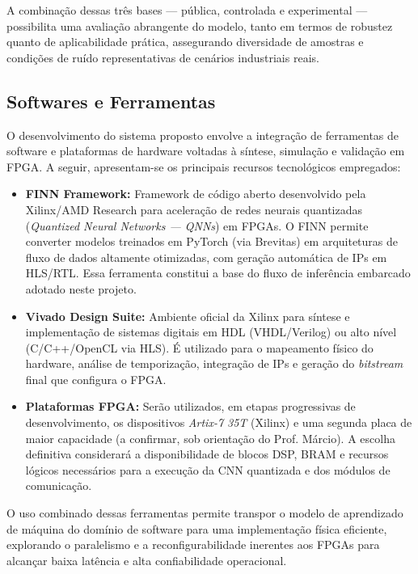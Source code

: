 A combinação dessas três bases — pública, controlada e experimental — possibilita uma avaliação abrangente do modelo, tanto em termos de robustez quanto de aplicabilidade prática, assegurando diversidade de amostras e condições de ruído representativas de cenários industriais reais.

\subsection*{Softwares e Ferramentas}

O desenvolvimento do sistema proposto envolve a integração de ferramentas de software e plataformas de hardware voltadas à síntese, simulação e validação em FPGA. A seguir, apresentam-se os principais recursos tecnológicos empregados:

\begin{itemize}
    \item \textbf{FINN Framework:}  
    Framework de código aberto desenvolvido pela Xilinx/AMD Research para aceleração de redes neurais quantizadas (\textit{Quantized Neural Networks — QNNs}) em FPGAs. O FINN permite converter modelos treinados em PyTorch (via Brevitas) em arquiteturas de fluxo de dados altamente otimizadas, com geração automática de IPs em HLS/RTL. Essa ferramenta constitui a base do fluxo de inferência embarcado adotado neste projeto.

    \item \textbf{Vivado Design Suite:}  
    Ambiente oficial da Xilinx para síntese e implementação de sistemas digitais em HDL (VHDL/Verilog) ou alto nível (C/C++/OpenCL via HLS). É utilizado para o mapeamento físico do hardware, análise de temporização, integração de IPs e geração do \textit{bitstream} final que configura o FPGA.

    \item \textbf{Plataformas FPGA:}  
    Serão utilizados, em etapas progressivas de desenvolvimento, os dispositivos \textit{Artix-7 35T} (Xilinx) e uma segunda placa de maior capacidade (a confirmar, sob orientação do Prof. Márcio). A escolha definitiva considerará a disponibilidade de blocos DSP, BRAM e recursos lógicos necessários para a execução da CNN quantizada e dos módulos de comunicação.
\end{itemize}

O uso combinado dessas ferramentas permite transpor o modelo de aprendizado de máquina do domínio de software para uma implementação física eficiente, explorando o paralelismo e a reconfigurabilidade inerentes aos FPGAs para alcançar baixa latência e alta confiabilidade operacional.

